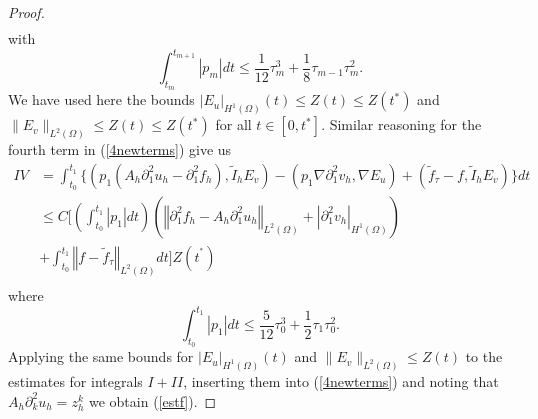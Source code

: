 \documentclass{imanum}
\begin{document}
\begin{proof}
\begin{align*}
\end{align*}
with
$$
\int_{t_m}^{t_{m + 1}} |p_m|{dt} \leq \frac{1}{12}{\tau}_{m}^{3}+\frac{1}{8}{\tau}_{m-1}{\tau}_{m}^2.
$$
We have used here the bounds $|E_u |_{H^1(\Omega)} (t) \leqslant Z (t) \leqslant Z
(t^{\ast})$ and $\|E_v \|_{L^2(\Omega)} \leqslant Z (t) \leqslant Z (t^{\ast})$ for all $t
\in [0, t^{\ast}]$. Similar reasoning for the fourth term in (\ref{4newterms}) give us
\begin{align*}
 I V &= \int_{t_0}^{t_1} \{(p_1 (A_h {\partial}_{1}^{2} u_{h}-{\partial}_{1}^{2}f_h),\tilde I_{h} E_{v})-\left(p_1 {\nabla}{\partial}_{1}^{2} v_{h},{\nabla}E_{u}\right)
  +(\tilde{f}_\tau-f,\tilde I_{h} E_{v}) \}dt \\
   & \leq C
    \Biggl[ \left( \int_{t_0}^{t^{}_{ 1}} |p_1|{dt} \right) 
   \left( \left\Vert \partial_1^2 f_h - A_h \partial_1^2 u_h \right\Vert_{L^2(\Omega)} + \left\vert \partial_1^2 v_h\right\vert_{H^1(\Omega)}\right)\\
   &+\int_{t_0}^{t^{}_{1}} \left\Vert f-\tilde{f}_\tau \right\Vert_{L^2(\Omega)} {dt} \Biggr] Z ( t^{^{\ast}}) \\
\end{align*}
where
$$
\int_{t_0}^{t_{1}} |p_1|{dt} \leq \frac{5}{12}{\tau}_{0}^{3}+\frac{1}{2}{\tau}_{1}{\tau}_{0}^2.
$$
Applying the same bounds for $|E_u |_{H^1(\Omega)} (t)$ and $\|E_v \|_{L^2(\Omega)} \leqslant Z (t)$ to the estimates for integrals  $I+II$, inserting them into  (\ref{4newterms}) and noting that $A_h\partial^2_k u_h=z^k_h$ we obtain (\ref{estf}).
\end{proof}
\end{document}
